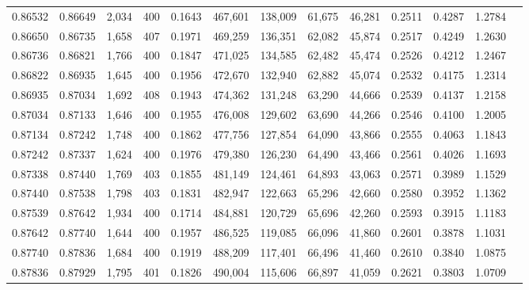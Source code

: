 \begin{tabular}{rrrrrrrrrrrrr}
0.86532 & 0.86649 & 2,034 & 400 &                                     0.1643 & 467,601 & 138,009 &  61,675 &  46,281 & 0.2511 & 0.4287 & 1.2784 \\
0.86650 & 0.86735 & 1,658 & 407 &                                     0.1971 & 469,259 & 136,351 &  62,082 &  45,874 & 0.2517 & 0.4249 & 1.2630 \\
0.86736 & 0.86821 & 1,766 & 400 &                                     0.1847 & 471,025 & 134,585 &  62,482 &  45,474 & 0.2526 & 0.4212 & 1.2467 \\
0.86822 & 0.86935 & 1,645 & 400 &                                     0.1956 & 472,670 & 132,940 &  62,882 &  45,074 & 0.2532 & 0.4175 & 1.2314 \\
0.86935 & 0.87034 & 1,692 & 408 &                                     0.1943 & 474,362 & 131,248 &  63,290 &  44,666 & 0.2539 & 0.4137 & 1.2158 \\
0.87034 & 0.87133 & 1,646 & 400 &                                     0.1955 & 476,008 & 129,602 &  63,690 &  44,266 & 0.2546 & 0.4100 & 1.2005 \\
0.87134 & 0.87242 & 1,748 & 400 &                                     0.1862 & 477,756 & 127,854 &  64,090 &  43,866 & 0.2555 & 0.4063 & 1.1843 \\
0.87242 & 0.87337 & 1,624 & 400 &                                     0.1976 & 479,380 & 126,230 &  64,490 &  43,466 & 0.2561 & 0.4026 & 1.1693 \\
0.87338 & 0.87440 & 1,769 & 403 &                                     0.1855 & 481,149 & 124,461 &  64,893 &  43,063 & 0.2571 & 0.3989 & 1.1529 \\
0.87440 & 0.87538 & 1,798 & 403 &                                     0.1831 & 482,947 & 122,663 &  65,296 &  42,660 & 0.2580 & 0.3952 & 1.1362 \\
0.87539 & 0.87642 & 1,934 & 400 &                                     0.1714 & 484,881 & 120,729 &  65,696 &  42,260 & 0.2593 & 0.3915 & 1.1183 \\
0.87642 & 0.87740 & 1,644 & 400 &                                     0.1957 & 486,525 & 119,085 &  66,096 &  41,860 & 0.2601 & 0.3878 & 1.1031 \\
0.87740 & 0.87836 & 1,684 & 400 &                                     0.1919 & 488,209 & 117,401 &  66,496 &  41,460 & 0.2610 & 0.3840 & 1.0875 \\
0.87836 & 0.87929 & 1,795 & 401 &                                     0.1826 & 490,004 & 115,606 &  66,897 &  41,059 & 0.2621 & 0.3803 & 1.0709 \\

\end{tabular}
